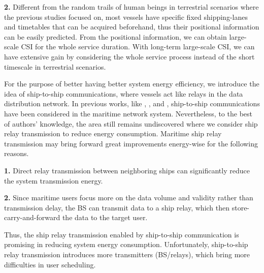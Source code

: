 \documentclass[conference]{IEEEtran}
\begin{document}
\textbf{2.} Different from the random trails of human beings in terrestrial scenarios where the previous studies focused on, most vessels have specific fixed shipping-lanes and timetables that can be acquired beforehand, thus their positional information can be easily predicted. From the positional information, we can obtain large-scale CSI  for the whole service duration. With long-term large-scale CSI, we can have extensive gain by considering the whole service process instead of the short timescale in terrestrial scenarios. 

For the purpose of better having better system energy efficiency, we introduce the idea of ship-to-ship communications, where vessels act like relays in the data distribution network. In previous works, like \cite{p321}, \cite{p32}, and \cite{p410}, ship-to-ship communications have been considered in the maritime network system. Nevertheless, to the best of authors' knowledge, the area still remains undiscovered where we consider ship relay transmission to reduce energy consumption. Maritime ship relay transmission may bring forward great improvements energy-wise for the following reasons.

\textbf{1.} Direct relay transmission between neighboring ships can significantly reduce the system transmission energy. 

\textbf{2.} Since maritime users focus more on the data volume and validity rather than transmission delay, the BS can transmit data to a ship relay, which then store-carry-and-forward the data to the target user. 

Thus, the ship relay transmission enabled by ship-to-ship communication is promising in reducing system energy consumption. 
Unfortunately, ship-to-ship relay transmission introduces more transmitters (BS/relays), which bring more difficulties in user scheduling. 



\end{document}
